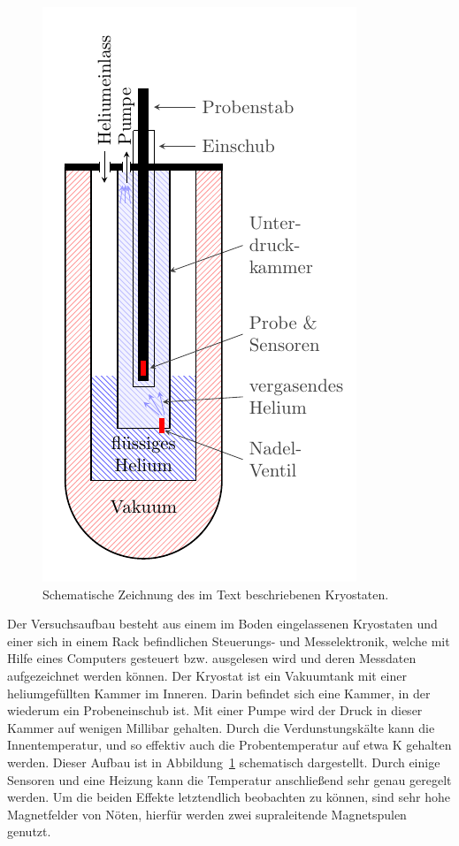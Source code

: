 \documentclass[12pt,a4paper]{article}
\begin{document}
	\begin{figure}
		\centering
		\includegraphics[scale=1]{graphs/aufbau/tank.pdf}
		\caption[Schematischer Aufbau des Kryostaten]{Schematische Zeichnung des im Text beschriebenen Kryostaten.}
		\label{fig:kryo}
	\end{figure}
	Der Versuchsaufbau besteht aus einem im Boden eingelassenen Kryostaten und einer sich in einem Rack befindlichen Steuerungs- und Messelektronik, welche mit Hilfe eines Computers gesteuert bzw. ausgelesen wird und deren Messdaten aufgezeichnet werden können. Der Kryostat ist ein Vakuumtank mit einer heliumgefüllten Kammer im Inneren. Darin befindet sich eine Kammer, in der wiederum ein Probeneinschub ist. Mit einer Pumpe wird der Druck in dieser Kammer auf wenigen Millibar gehalten. Durch die Verdunstungskälte kann die Innentemperatur, und so effektiv auch die Probentemperatur auf etwa \unit[1,5]{K} gehalten werden. Dieser Aufbau ist in Abbildung~\ref{fig:kryo} schematisch dargestellt. Durch einige Sensoren und eine Heizung kann die Temperatur anschließend sehr genau geregelt werden. Um die beiden Effekte letztendlich beobachten zu können, sind sehr hohe Magnetfelder von Nöten, hierfür werden zwei supraleitende Magnetspulen genutzt.\\
	
\end{document}
